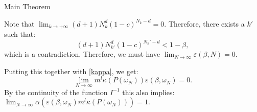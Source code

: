 \begin{subsection}{Main Theorem}
\begin{pf}
Note that $\lim_{k \to +\infty}(d+1)N_k^d (1-c)^{N_k-d} = 0.$ Therefore, there exists a $k'$ such that:
$$(d+1)N_{k'}^d (1-c)^{N_k'-d} < 1 - \beta,$$ which is a contradiction. Therefore, we must have  $\lim_{N \to \infty} \varepsilon (\beta, N) = 0$.

Putting this together with \eqref{kappa}, we get:
$$\lim_{N \to \infty} m^l \kappa(P(\omega_N)) \varepsilon(\beta, \omega_N) = 0.$$ By the continuity of the function $I^{-1}$ this also implies: $\lim_{N \to \infty} \alpha \left( \varepsilon(\beta, \omega_N) m^l \kappa(P(\omega_N)) \right) = 1.$

\end{pf}

\end{subsection}